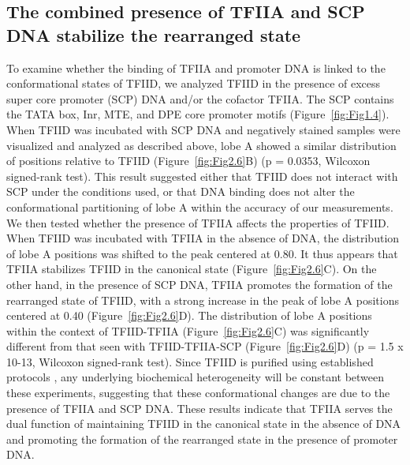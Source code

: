 \subsection{The combined presence of TFIIA and SCP DNA stabilize the rearranged state}
To examine whether the binding of TFIIA and promoter DNA is linked to the conformational states of TFIID, we analyzed TFIID in the presence of excess super core promoter (SCP) DNA and/or the cofactor TFIIA. The SCP contains the TATA box, Inr, MTE, and DPE core promoter motifs (Figure~\ref{fig:Fig1.4}). When TFIID was incubated with SCP DNA and negatively stained samples were visualized and analyzed as described above, lobe A showed a similar distribution of positions relative to TFIID (Figure~\ref{fig:Fig2.6}B) (p = 0.0353, Wilcoxon signed-rank test). This result suggested either that TFIID does not interact with SCP under the conditions used, or that DNA binding does not alter the conformational partitioning of lobe A within the accuracy of our measurements.\\
\indent We then tested whether the presence of TFIIA affects the properties of TFIID. When TFIID was incubated with TFIIA in the absence of DNA, the distribution of lobe A positions was shifted to the peak centered at 0.80. It thus appears that TFIIA stabilizes TFIID in the canonical state  (Figure~\ref{fig:Fig2.6}C). On the other hand, in the presence of SCP DNA, TFIIA promotes the formation of the rearranged state of TFIID, with a strong increase in the peak of lobe A positions centered at 0.40  (Figure~\ref{fig:Fig2.6}D). The distribution of lobe A positions within the context of TFIID-TFIIA  (Figure~\ref{fig:Fig2.6}C) was significantly different from that seen with TFIID-TFIIA-SCP  (Figure~\ref{fig:Fig2.6}D) (p = 1.5 x 10-13, Wilcoxon signed-rank test). Since TFIID is purified using established protocols \cite{Liu_723,Liu_574}, any underlying biochemical heterogeneity will be constant between these experiments, suggesting that these conformational changes are due to the presence of TFIIA and SCP DNA. These results indicate that TFIIA serves the dual function of maintaining TFIID in the canonical state in the absence of DNA and promoting the formation of the rearranged state in the presence of promoter DNA.\\

